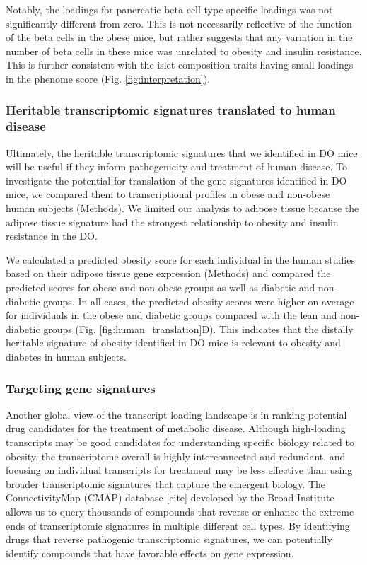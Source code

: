 \documentclass[
]{article}
\begin{document}
Notably, the loadings for pancreatic beta cell-type specific loadings
was not significantly different from zero. This is not necessarily
reflective of the function of the beta cells in the obese mice, but
rather suggests that any variation in the number of beta cells in these
mice was unrelated to obesity and insulin resistance. This is further
consistent with the islet composition traits having small loadings in
the phenome score (Fig. \ref{fig:interpretation}).

\subsubsection{Heritable transcriptomic signatures translated to human
disease}\label{heritable-transcriptomic-signatures-translated-to-human-disease}

Ultimately, the heritable transcriptomic signatures that we identified
in DO mice will be useful if they inform pathogenicity and treatment of
human disease. To investigate the potential for translation of the gene
signatures identified in DO mice, we compared them to transcriptional
profiles in obese and non-obese human subjects (Methods). We limited our
analysis to adipose tissue because the adipose tissue signature had the
strongest relationship to obesity and insulin resistance in the DO.

We calculated a predicted obesity score for each individual in the human
studies based on their adipose tissue gene expression (Methods) and
compared the predicted scores for obese and non-obese groups as well as
diabetic and non-diabetic groups. In all cases, the predicted obesity
scores were higher on average for individuals in the obese and diabetic
groups compared with the lean and non-diabetic groups (Fig.
\ref{fig:human_translation}D). This indicates that the distally
heritable signature of obesity identified in DO mice is relevant to
obesity and diabetes in human subjects.

\subsubsection{Targeting gene
signatures}\label{targeting-gene-signatures}

Another global view of the transcript loading landscape is in ranking
potential drug candidates for the treatment of metabolic disease.
Although high-loading transcripts may be good candidates for
understanding specific biology related to obesity, the transcriptome
overall is highly interconnected and redundant, and focusing on
individual transcripts for treatment may be less effective than using
broader transcriptomic signatures that capture the emergent biology. The
ConnectivityMap (CMAP) database {[}cite{]} developed by the Broad
Institute allows us to query thousands of compounds that reverse or
enhance the extreme ends of transcriptomic signatures in multiple
different cell types. By identifying drugs that reverse pathogenic
transcriptomic signatures, we can potentially identify compounds that
have favorable effects on gene expression.
\end{document}
